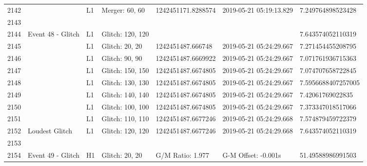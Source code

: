 \begin{longtable}{lllllll}
2142 &                                                    &       L1 &    Merger: 60, 60 &  1242451171.8288574 &  2019-05-21 05:19:13.829 &   7.249764898523428 \\
2143 &                                                    &          &                   &                     &                          &                     \\
2144 &                                  Event 48 - Glitch &       L1 &  Glitch: 120, 120 &                     &                          &   7.643574052110319 \\
2145 &                                                    &       L1 &    Glitch: 20, 20 &   1242451487.666748 &  2019-05-21 05:24:29.667 &   7.271454455208795 \\
2146 &                                                    &       L1 &    Glitch: 90, 90 &  1242451487.6669922 &  2019-05-21 05:24:29.667 &   7.071761936715363 \\
2147 &                                                    &       L1 &  Glitch: 150, 150 &  1242451487.6674805 &  2019-05-21 05:24:29.667 &   7.074707658722845 \\
2148 &                                                    &       L1 &  Glitch: 130, 130 &  1242451487.6674805 &  2019-05-21 05:24:29.667 &  7.5956688407257005 \\
2149 &                                                    &       L1 &  Glitch: 140, 140 &  1242451487.6674805 &  2019-05-21 05:24:29.667 &    7.42061769022835 \\
2150 &                                                    &       L1 &  Glitch: 100, 100 &  1242451487.6674805 &  2019-05-21 05:24:29.667 &   7.373347018517066 \\
2151 &                                                    &       L1 &  Glitch: 110, 110 &  1242451487.6677246 &  2019-05-21 05:24:29.668 &   7.574879459722379 \\
2152 &                                     Loudest Glitch &       L1 &  Glitch: 120, 120 &  1242451487.6677246 &  2019-05-21 05:24:29.668 &   7.643574052110319 \\
2153 &                                                    &          &                   &                     &                          &                     \\
2154 &                                  Event 49 - Glitch &       H1 &    Glitch: 20, 20 &    G/M Ratio: 1.977 &      G-M Offset: -0.001s &   51.49588986991503 \\

\end{longtable}
